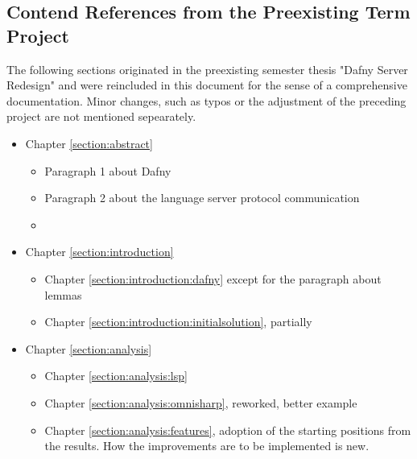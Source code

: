 \subsection{Contend References from the Preexisting Term Project}
The following sections originated in the preexisting semester thesis "Dafny Server Redesign"\cite{sa} and were reincluded in this document for the sense of a comprehensive documentation. Minor changes, such as typos or the adjustment of the preceding project are not mentioned sepearately.


\begin{itemize}
    \item Chapter \ref{section:abstract} 
        \begin{itemize}
            \item Paragraph 1 about Dafny
            \item Paragraph 2 about the language server protocol communication
            \item  {}
        \end{itemize}
    \item Chapter \ref{section:introduction} 
        \begin{itemize}
            \item Chapter \ref{section:introduction:dafny} except for the paragraph about lemmas
            \item Chapter \ref{section:introduction:initialsolution}, partially
        \end{itemize}

    \item Chapter \ref{section:analysis} 
        \begin{itemize}
            \item Chapter \ref{section:analysis:lsp}
            \item Chapter \ref{section:analysis:omnisharp}, reworked, better example
            \item Chapter \ref{section:analysis:features}, adoption of the starting positions from the results. How the improvements are to be implemented is new.
        \end{itemize}


\end{itemize}
